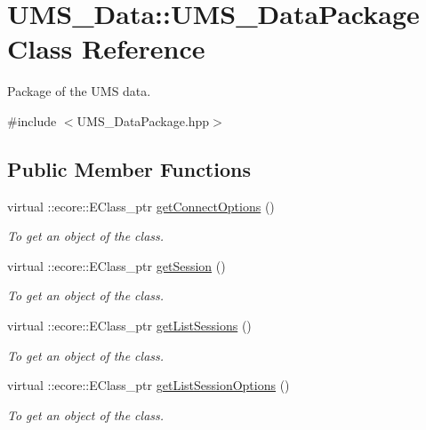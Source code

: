 \hypertarget{classUMS__Data_1_1UMS__DataPackage}{
\section{UMS\_\-Data::UMS\_\-DataPackage Class Reference}
\label{classUMS__Data_1_1UMS__DataPackage}
}


Package of the UMS data.  




{\ttfamily \#include $<$UMS\_\-DataPackage.hpp$>$}

\subsection*{Public Member Functions}
\begin{DoxyCompactItemize}
\item 
virtual ::ecore::EClass\_\-ptr \hyperlink{classUMS__Data_1_1UMS__DataPackage_a47870c08380ecfbf2edae9e2a23b2183}{getConnectOptions} ()
\begin{DoxyCompactList}\small\item\em To get an object of the class. \item\end{DoxyCompactList}\item 
virtual ::ecore::EClass\_\-ptr \hyperlink{classUMS__Data_1_1UMS__DataPackage_a311d3731e18451a17a1ae5b5fc0be782}{getSession} ()
\begin{DoxyCompactList}\small\item\em To get an object of the class. \item\end{DoxyCompactList}\item 
virtual ::ecore::EClass\_\-ptr \hyperlink{classUMS__Data_1_1UMS__DataPackage_aa9969a7f93f591fd94f679bf07afd9a6}{getListSessions} ()
\begin{DoxyCompactList}\small\item\em To get an object of the class. \item\end{DoxyCompactList}\item 
virtual ::ecore::EClass\_\-ptr \hyperlink{classUMS__Data_1_1UMS__DataPackage_a17c4fe0d781fdc8b8debff05608a455a}{getListSessionOptions} ()
\begin{DoxyCompactList}\small\item\em To get an object of the class. \item\end{DoxyCompactList}\item 

\end{DoxyCompactItemize}
